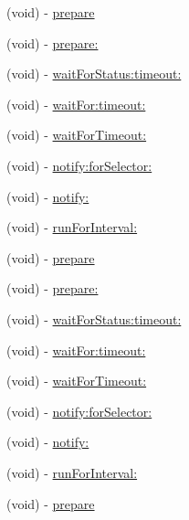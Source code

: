 \begin{DoxyCompactItemize}
\item 
(void) -\/ \hyperlink{interface_g_h_async_test_case_a8eda5b64c599e0c48bbd206840bd4cde}{prepare}
\item 
(void) -\/ \hyperlink{interface_g_h_async_test_case_a085b47a16f4a790d77ba78bd2eafb3ff}{prepare\-:}
\item 
(void) -\/ \hyperlink{interface_g_h_async_test_case_ae8781529003ebef3a06569c0157687ae}{wait\-For\-Status\-:timeout\-:}
\item 
(void) -\/ \hyperlink{interface_g_h_async_test_case_a43422127c8303a93f0ae39c883a2da06}{wait\-For\-:timeout\-:}
\item 
(void) -\/ \hyperlink{interface_g_h_async_test_case_aaf22dd45b3493e110362392cc3dc086b}{wait\-For\-Timeout\-:}
\item 
(void) -\/ \hyperlink{interface_g_h_async_test_case_ab1be43eb4f4909ce5607b51fa0a1f40b}{notify\-:for\-Selector\-:}
\item 
(void) -\/ \hyperlink{interface_g_h_async_test_case_ad21d6cdd1f2a284ee7b5ad5b6d1c82e2}{notify\-:}
\item 
(void) -\/ \hyperlink{interface_g_h_async_test_case_accbc972d3d516d1e53529c84fa2fc510}{run\-For\-Interval\-:}
\item 
(void) -\/ \hyperlink{interface_g_h_async_test_case_a8eda5b64c599e0c48bbd206840bd4cde}{prepare}
\item 
(void) -\/ \hyperlink{interface_g_h_async_test_case_a085b47a16f4a790d77ba78bd2eafb3ff}{prepare\-:}
\item 
(void) -\/ \hyperlink{interface_g_h_async_test_case_ae8781529003ebef3a06569c0157687ae}{wait\-For\-Status\-:timeout\-:}
\item 
(void) -\/ \hyperlink{interface_g_h_async_test_case_a43422127c8303a93f0ae39c883a2da06}{wait\-For\-:timeout\-:}
\item 
(void) -\/ \hyperlink{interface_g_h_async_test_case_aaf22dd45b3493e110362392cc3dc086b}{wait\-For\-Timeout\-:}
\item 
(void) -\/ \hyperlink{interface_g_h_async_test_case_ab1be43eb4f4909ce5607b51fa0a1f40b}{notify\-:for\-Selector\-:}
\item 
(void) -\/ \hyperlink{interface_g_h_async_test_case_ad21d6cdd1f2a284ee7b5ad5b6d1c82e2}{notify\-:}
\item 
(void) -\/ \hyperlink{interface_g_h_async_test_case_accbc972d3d516d1e53529c84fa2fc510}{run\-For\-Interval\-:}
\item 
(void) -\/ \hyperlink{interface_g_h_async_test_case_a8eda5b64c599e0c48bbd206840bd4cde}{prepare}

\end{DoxyCompactItemize}
